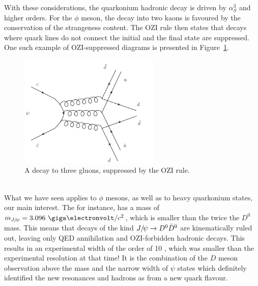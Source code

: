 With these considerations, the quarkonium hadronic decay is driven by
$\alpha_{S}^{3}$ and higher orders. For the $\phi$ meson, the decay into two kaons is
favoured by the conservation of the strangeness content. The OZI rule
then states that decays where quark lines do not connect the initial
and the final state are suppressed. One such example of OZI-suppressed
diagrams is presented in Figure~\ref{fig:OZI}.
\\
\begin{figure}[h]
\begin{center}
  \includegraphics[width=0.6\textwidth]{Chapters/pQuarkonia/OZI.pdf}
 \caption{A \Jpsi decay to three gluons, suppressed by the OZI rule.}
 \label{fig:OZI}
\end{center}
\end{figure}
\\
What we have seen applies to $\phi$ mesons, as well as to %
heavy quarkonium states, our main interest. The \Jpsi for instance, has a mass of $m_{\Jpsi} = 3.096~
\GeV/c^{2}$, which is smaller than the twice the $D^{0}$ mass. This
means that decays of the kind $J\hspace{-.08em}/\hspace{-.14em}\psi \to D^{0}\bar{D}^{0}$ are
kinematically ruled out, leaving only QED annihilation and
OZI-forbidden hadronic decays. This results in an experimental width
of the order of 10 \keV, which was smaller than the experimental
resolution at that time! It is the combination of the $D$ meson observation above the
\Jpsi mass and the narrow width of $\psi$ states which definitely
identified the new resonances and hadrons as from a new quark flavour.
\\
